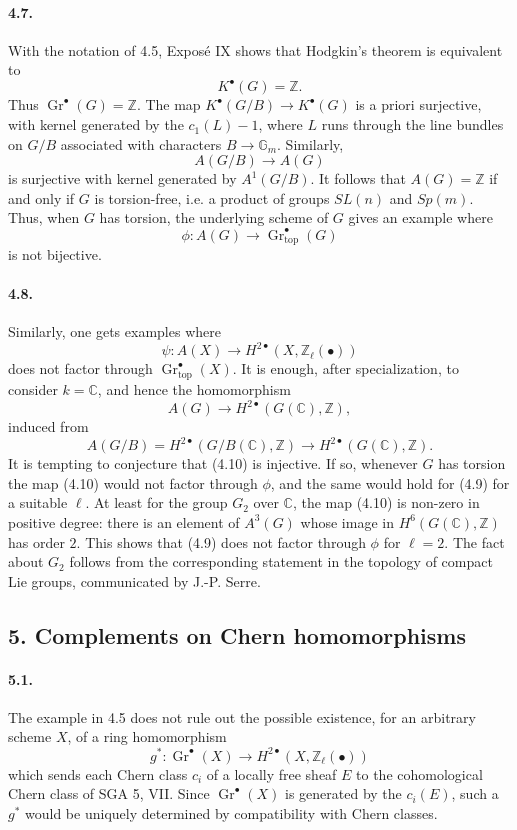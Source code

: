 \documentclass[12pt]{article}
\newcommand{\ZZ}{\mathbb Z}
\newcommand{\CC}{\mathbb C}
\newcommand{\GG}{\mathbb G}
\newcommand{\Gr}{\operatorname{Gr}}
\newcommand{\longto}{\longrightarrow}
\newcommand{\topf}{\mathrm{top}}
\begin{document}
\paragraph{4.7.}
With the notation of 4.5, Exposé IX shows that Hodgkin's theorem is equivalent to
\[
K^\bullet(G)=\ZZ.
\]
Thus $\Gr^\bullet(G)=\ZZ$. The map $K^\bullet(G/B)\to K^\bullet(G)$ is a priori surjective, with kernel generated by the $c_1(L)-1$, where $L$ runs through the line bundles on $G/B$ associated with characters $B\to \GG_m$. Similarly,
\[
A(G/B)\to A(G)
\]
is surjective with kernel generated by $A^1(G/B)$. It follows that $A(G)=\ZZ$ if and only if $G$ is torsion-free, i.e. a product of groups $SL(n)$ and $Sp(m)$. Thus, when $G$ has torsion, the underlying scheme of $G$ gives an example where
\[
\phi:A(G)\to\Gr^\bullet_{\topf}(G)
\]
is not bijective.

\paragraph{4.8.}
Similarly, one gets examples where
\[
\psi:A(X)\to H^{2\bullet}(X,\ZZ_\ell(\bullet))
\tag{4.9}
\]
does not factor through $\Gr^\bullet_{\topf}(X)$. It is enough, after specialization, to consider $k=\CC$, and hence the homomorphism
\[
A(G)\to H^{2\bullet}(G(\CC),\ZZ),
\tag{4.10}
\]
induced from
\[
A(G/B)=H^{2\bullet}(G/B(\CC),\ZZ)\to H^{2\bullet}(G(\CC),\ZZ).
\]
It is tempting to conjecture that (4.10) is injective. If so, whenever $G$ has torsion the map (4.10) would not factor through $\phi$, and the same would hold for (4.9) for a suitable $\ell$. At least for the group $G_2$ over $\CC$, the map (4.10) is non-zero in positive degree: there is an element of $A^3(G)$ whose image in $H^6(G(\CC),\ZZ)$ has order $2$. This shows that (4.9) does not factor through $\phi$ for $\ell=2$. The fact about $G_2$ follows from the corresponding statement in the topology of compact Lie groups, communicated by J.-P. Serre.

\subsection*{5. Complements on Chern homomorphisms}

\paragraph{5.1.}
The example in 4.5 does not rule out the possible existence, for an arbitrary scheme $X$, of a ring homomorphism
\[
g^*:\Gr^\bullet(X)\longto H^{2\bullet}(X,\ZZ_\ell(\bullet))
\]
which sends each Chern class $c_i$ of a locally free sheaf $E$ to the cohomological Chern class of SGA 5, VII. Since $\Gr^\bullet(X)$ is generated by the $c_i(E)$, such a $g^*$ would be uniquely determined by compatibility with Chern classes.
\end{document}
